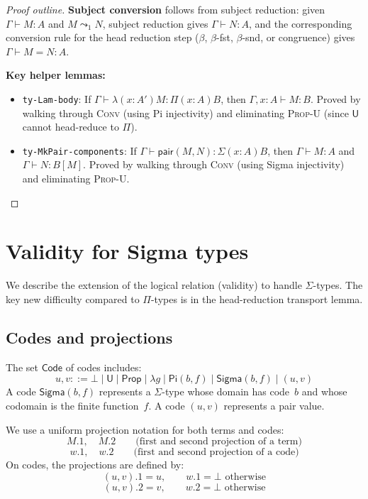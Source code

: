 \documentclass[11pt]{article}
\newcommand{\hastype}[3]{#1 \vdash #2 : #3}
\newcommand{\conveq}[4]{#1 \vdash #2 = #3 : #4}
\newcommand{\Pitype}[2]{\Pi(#1)#2}
\newcommand{\Lamterm}[2]{\lambda(#1)#2}
\newcommand{\substone}[2]{#1[#2]}
\newcommand{\U}{\mathsf{U}}
\newcommand{\Prop}{\mathsf{Prop}}
\newcommand{\PiC}[2]{\mathsf{Pi}(#1,#2)}
\newcommand{\SigmaC}[2]{\mathsf{Sigma}(#1,#2)}
\newcommand{\Sigmatype}[2]{\Sigma(#1)#2}
\newcommand{\MkPair}[2]{\mathsf{pair}(#1,#2)}
\newcommand{\FinEl}{\mathsf{Code}}
\newcommand{\Bot}{\bot}
\newcommand{\pj}[2]{#1\mbox{.}#2}
\begin{document}
\begin{proof}[Proof outline]
  \medskip\noindent\textbf{Subject conversion} follows from subject
  reduction: given $\hastype{\Gamma}{M}{A}$ and $M \leadsto_1 N$,
  subject reduction gives $\hastype{\Gamma}{N}{A}$, and the
  corresponding conversion rule for the head reduction step
  ($\beta$, $\beta$-fst, $\beta$-snd, or congruence) gives
  $\conveq{\Gamma}{M}{N}{A}$.

  \medskip\noindent\textbf{Key helper lemmas:}
  \begin{itemize}
    \item \texttt{ty-Lam-body}: If
      $\hastype{\Gamma}{\Lamterm{x{:}A'}{M}}{\Pitype{x{:}A}{B}}$,
      then $\hastype{\Gamma, x{:}A}{M}{B}$.  Proved by walking
      through \textsc{Conv} (using Pi injectivity) and eliminating
      \textsc{Prop-U} (since $\U$ cannot head-reduce to $\Pi$).
    \item \texttt{ty-MkPair-components}: If
      $\hastype{\Gamma}{\MkPair{M}{N}}{\Sigmatype{x{:}A}{B}}$,
      then $\hastype{\Gamma}{M}{A}$ and
      $\hastype{\Gamma}{N}{\substone{B}{M}}$.  Proved by walking
      through \textsc{Conv} (using Sigma injectivity) and
      eliminating \textsc{Prop-U}.
  \end{itemize}
\end{proof}

\section{Validity for Sigma types}\label{sec:sigma-val}

We describe the extension of the logical relation (validity) to handle
$\Sigma$-types.
The key new difficulty compared to $\Pi$-types is in the head-reduction
transport lemma.

\subsection{Codes and projections}

The set $\FinEl$ of codes includes:
\[
  u,v ::= \Bot \mid \U \mid \Prop \mid \lambda g \mid \PiC{b}{f}
         \mid \SigmaC{b}{f} \mid (u,v)
\]
A code $\SigmaC{b}{f}$ represents a $\Sigma$-type whose domain has code~$b$
and whose codomain is the finite function~$f$.
A code $(u,v)$ represents a pair value.

We use a uniform projection notation for both terms and codes:
\[
  \pj{M}{1},\quad \pj{M}{2} \qquad\text{(first and second projection of a term)}
\]
\[
  \pj{w}{1},\quad \pj{w}{2} \qquad\text{(first and second projection of a code)}
\]
On codes, the projections are defined by:
\[
  \pj{(u,v)}{1} = u, \qquad \pj{w}{1} = \Bot \text{ otherwise}
\]
\[
  \pj{(u,v)}{2} = v, \qquad \pj{w}{2} = \Bot \text{ otherwise}
\]
\end{document}
